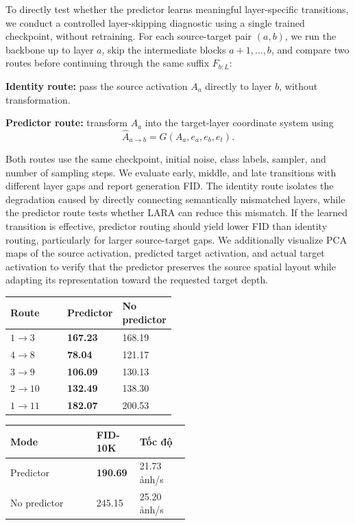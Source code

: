 \documentclass[10pt,letterpaper]{article}
\begin{document}
\begin{answerbox}

To directly test whether the predictor learns meaningful layer-specific transitions, we conduct a controlled layer-skipping diagnostic using a single trained checkpoint, without retraining. For each source-target pair \((a,b)\), we run the backbone up to layer \(a\), skip the intermediate blocks \(a+1,\ldots,b\), and compare two routes before continuing through the same suffix \(F_{b:L}\):


\textbf{Identity route:} pass the source activation \(A_a\) directly to layer \(b\), without transformation.


\textbf{Predictor route:} transform \(A_a\) into the target-layer coordinate system using
\[
\widehat{A}_{a\to b}=G(A_a,e_a,e_b,e_t).
\]


Both routes use the same checkpoint, initial noise, class labels, sampler, and number of sampling steps. We evaluate early, middle, and late transitions with different layer gaps and report generation FID. The identity route isolates the degradation caused by directly connecting semantically mismatched layers, while the predictor route tests whether LARA can reduce this mismatch. If the learned transition is effective, predictor routing should yield lower FID than identity routing, particularly for larger source-target gaps. We additionally visualize PCA maps of the source activation, predicted target activation, and actual target activation to verify that the predictor preserves the source spatial layout while adapting its representation toward the requested target depth.


\begin{cleanTable}
\small
\begin{tabularx}{\linewidth}{Y C{0.24\linewidth} C{0.24\linewidth}}
\bfseries\color{white} Route & \bfseries\color{white} Predictor & \bfseries\color{white} No predictor \\
\midrule
\(1\to3\) & \bfseries 167.23 & 168.19 \\
\(4\to8\) & \bfseries 78.04 & 121.17 \\
\(3\to9\) & \bfseries 106.09 & 130.13 \\
\(2\to10\) & \bfseries 132.49 & 138.30 \\
\(1\to11\) & \bfseries 182.07 & 200.53 \\
\end{tabularx}
\end{cleanTable}

\begin{cleanTable}
\small
\begin{tabularx}{\linewidth}{Y C{0.24\linewidth} C{0.28\linewidth}}
\bfseries\color{white} Mode & \bfseries\color{white} FID-10K & \bfseries\color{white} Tốc độ \\
\midrule
Predictor & \bfseries 190.69 & 21.73 ảnh/s \\
No predictor & 245.15 & 25.20 ảnh/s \\
\end{tabularx}
\end{cleanTable}


\end{answerbox}
\end{document}
